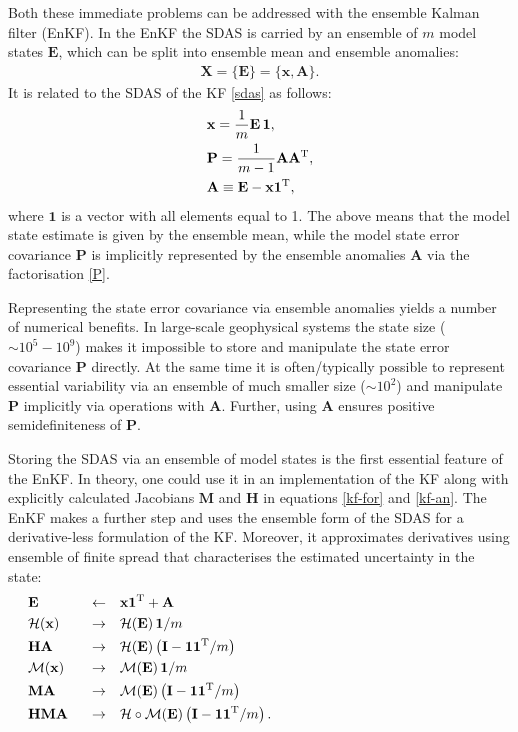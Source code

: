 \documentclass[11pt]{report}
\newcommand{\mb} {\mathbf}
\newcommand{\T}{^{\tiny \mathrm T}}
\begin{document}
Both these immediate problems can be addressed with the ensemble Kalman filter (EnKF).
In the EnKF the SDAS is carried by an ensemble of $m$ model states $\mb E$, which can be split into ensemble mean and ensemble anomalies:
\begin{align}
  \label{sdas-enkf}
  \mb X = \{\mb E\} = \{\mb x, \mb A\}.
\end{align}
It is related to the SDAS of the KF \eqref{sdas} as follows:
\begin{subequations}
  \label{E}
  \begin{align}
    \label{x}
    &\mb x = \frac{1}{m} \mb E \,\mb 1,\\
    \label{P}
    &\mb P = \frac{1}{m - 1} \mb A \mb A\T,\\
    \label{A}
    &\mb A \equiv \mb E - \mb x \mb 1\T,
  \end{align}
\end{subequations}
where $\mb 1$ is a vector with all elements equal to 1.
The above means that the model state estimate is given by the ensemble mean, while the model state error covariance $\mb P$ is implicitly represented by the ensemble anomalies $\mb A$ via the factorisation \eqref{P}.

Representing the state error covariance via ensemble anomalies yields a number of numerical benefits.
In large-scale geophysical systems the state size ($\sim 10^5-10^9$) makes it impossible to store and manipulate the state error covariance $\mb P$ directly.
At the same time it is often/typically possible to represent essential variability via an ensemble of much smaller size ($\sim 10^2$) and manipulate $\mb P$ implicitly via operations with $\mb A$.
Further, using $\mb A$ ensures positive semidefiniteness of $\mb P$.

Storing the SDAS via an ensemble of model states is the first essential feature of the EnKF.
In theory, one could use it in an implementation of the KF along with explicitly calculated Jacobians $\mb M$ and $\mb H$ in equations \eqref{kf-for} and \eqref{kf-an}.
The EnKF makes a further step and uses the ensemble form of the SDAS for a derivative-less formulation of the KF.
Moreover, it approximates derivatives using ensemble of finite spread that characterises the estimated uncertainty in the state:
\begin{subequations}
  \label{der-less-enkf}
  \begin{align}
    &\mb E \quad &\leftarrow& \quad \mb x \mb 1 \T  + \mb A \hspace{8cm}\\
    &\mathcal H (\mb x) \quad &\to& \quad \mathcal H (\mb E) \, \mb 1 / m\\
    &\mb H \mb A \quad &\to& \quad \mathcal H(\mb E)\left(\mb I - \mb 1 \mb 1\T / m\right)\\
    &\mathcal M (\mb x) \quad &\to& \quad \mathcal M (\mb E) \, \mb 1 / m\\
    &\mb M \mb A \quad &\to& \quad \mathcal M(\mb E)\left(\mb I - \mb 1 \mb 1\T / m\right)\\
    &\mb H \mb M \mb A &\to& \quad \mathcal H \circ \mathcal M(\mb E) \left(\mb I - \mb 1 \mb 1\T /m \right).
  \end{align}
\end{subequations}
\end{document}
